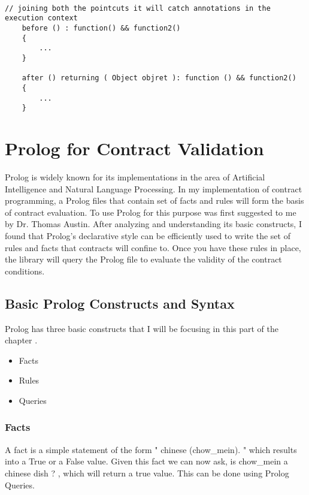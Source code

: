 \begin{minipage}{\linewidth}
\lstset{language=Java, caption=Pointcut Composition and before-after routines, captionpos=b, breaklines=true}       
\begin{lstlisting}[frame=single]

// joining both the pointcuts it will catch annotations in the execution context
	before () : function() && function2() 
	{
		...
	}
	
	after () returning ( Object objret ): function () && function2()
	{
		...
	}
\end{lstlisting}
\end{minipage} 


\section{Prolog for Contract Validation}

Prolog is widely known for its implementations in the area of Artificial Intelligence and Natural Language Processing. In my implementation of contract programming, a Prolog file\/s that contain set of facts and rules will form the basis of contract evaluation. To use Prolog for this purpose was first suggested to me by Dr. Thomas Austin. After analyzing and understanding its basic constructs, I found that Prolog's declarative style can be efficiently used to write the set of rules and facts that contracts will confine to. Once you have these rules in place, the library will query the Prolog file to evaluate the validity of the contract conditions.

\subsection{Basic Prolog Constructs and Syntax}

Prolog has three basic constructs that I will be focusing in this part of the chapter \cite{LearnProlog:online}.

\begin{itemize}
\item Facts
\item Rules
\item Queries
\end{itemize}

\subsubsection{Facts}
A fact is a simple statement of the form " chinese (chow\_mein). " which results into a True or a False value. Given this fact we can now ask, is chow\_mein a chinese dish ? , which will return a true value. This can be done using Prolog Queries.

